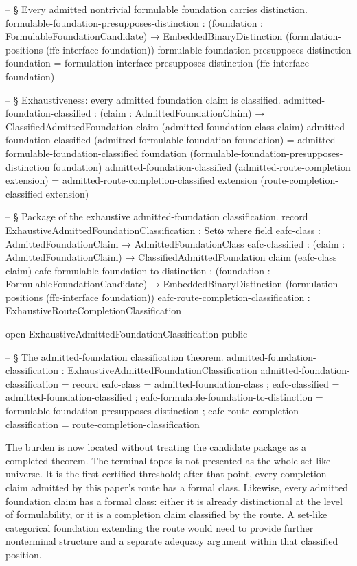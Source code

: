 \documentclass[11pt]{article}
\begin{document}
\begin{code}
-- § Every admitted nontrivial formulable foundation carries distinction.
formulable-foundation-presupposes-distinction :
  (foundation : FormulableFoundationCandidate) →
  EmbeddedBinaryDistinction
    (formulation-positions (ffc-interface foundation))
formulable-foundation-presupposes-distinction foundation =
  formulation-interface-presupposes-distinction (ffc-interface foundation)

-- § Exhaustiveness: every admitted foundation claim is classified.
admitted-foundation-classified :
  (claim : AdmittedFoundationClaim) →
  ClassifiedAdmittedFoundation claim (admitted-foundation-class claim)
admitted-foundation-classified
  (admitted-formulable-foundation foundation) =
  admitted-formulable-foundation-classified
    foundation
    (formulable-foundation-presupposes-distinction foundation)
admitted-foundation-classified (admitted-route-completion extension) =
  admitted-route-completion-classified
    extension
    (route-completion-classified extension)

-- § Package of the exhaustive admitted-foundation classification.
record ExhaustiveAdmittedFoundationClassification : Setω where
  field
    eafc-class : AdmittedFoundationClaim → AdmittedFoundationClass
    eafc-classified :
      (claim : AdmittedFoundationClaim) →
      ClassifiedAdmittedFoundation claim (eafc-class claim)
    eafc-formulable-foundation-to-distinction :
      (foundation : FormulableFoundationCandidate) →
      EmbeddedBinaryDistinction
        (formulation-positions (ffc-interface foundation))
    eafc-route-completion-classification :
      ExhaustiveRouteCompletionClassification

open ExhaustiveAdmittedFoundationClassification public

-- § The admitted-foundation classification theorem.
admitted-foundation-classification :
  ExhaustiveAdmittedFoundationClassification
admitted-foundation-classification = record
  { eafc-class = admitted-foundation-class
  ; eafc-classified = admitted-foundation-classified
  ; eafc-formulable-foundation-to-distinction =
      formulable-foundation-presupposes-distinction
  ; eafc-route-completion-classification = route-completion-classification
  }
\end{code}

The burden is now located without treating the candidate package as a
completed theorem.  The terminal topos is not presented as the whole
set-like universe.  It is the first certified threshold; after that
point, every completion claim admitted by this paper's route has a
formal class.  Likewise, every admitted foundation claim has a formal
class: either it is already distinctional at the level of formulability,
or it is a completion claim classified by the route.  A set-like
categorical foundation extending the route would need to provide further
nonterminal structure and a separate adequacy argument within that
classified position.
\end{document}
